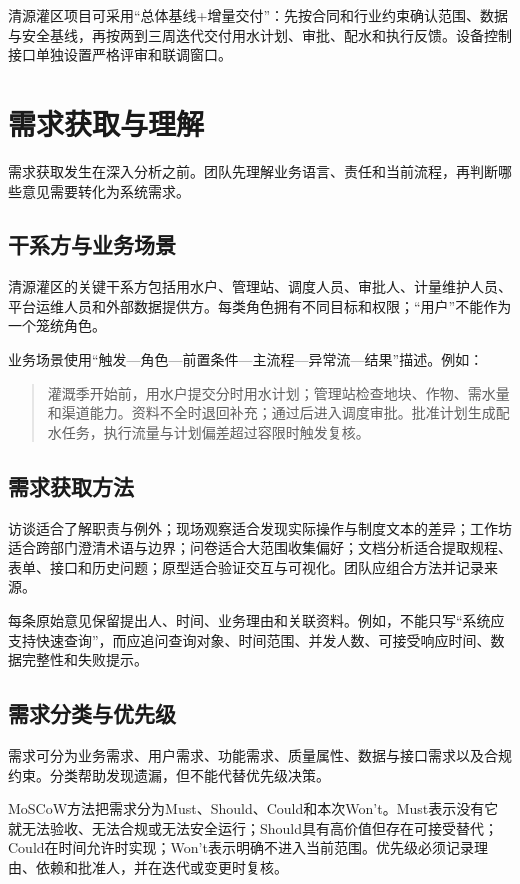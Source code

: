 清源灌区项目可采用“总体基线+增量交付”：先按合同和行业约束确认范围、数据与安全基线，再按两到三周迭代交付用水计划、审批、配水和执行反馈。设备控制接口单独设置严格评审和联调窗口。

\section{需求获取与理解}

需求获取发生在深入分析之前。团队先理解业务语言、责任和当前流程，再判断哪些意见需要转化为系统需求。

\subsection{干系方与业务场景}

清源灌区的关键干系方包括用水户、管理站、调度人员、审批人、计量维护人员、平台运维人员和外部数据提供方。每类角色拥有不同目标和权限；“用户”不能作为一个笼统角色。

业务场景使用“触发—角色—前置条件—主流程—异常流—结果”描述。例如：

\begin{quote}
灌溉季开始前，用水户提交分时用水计划；管理站检查地块、作物、需水量和渠道能力。资料不全时退回补充；通过后进入调度审批。批准计划生成配水任务，执行流量与计划偏差超过容限时触发复核。
\end{quote}

\subsection{需求获取方法}

访谈适合了解职责与例外；现场观察适合发现实际操作与制度文本的差异；工作坊适合跨部门澄清术语与边界；问卷适合大范围收集偏好；文档分析适合提取规程、表单、接口和历史问题；原型适合验证交互与可视化。团队应组合方法并记录来源。

每条原始意见保留提出人、时间、业务理由和关联资料。例如，不能只写“系统应支持快速查询”，而应追问查询对象、时间范围、并发人数、可接受响应时间、数据完整性和失败提示。

\subsection{需求分类与优先级}

需求可分为业务需求、用户需求、功能需求、质量属性、数据与接口需求以及合规约束。分类帮助发现遗漏，但不能代替优先级决策。

MoSCoW方法把需求分为Must、Should、Could和本次Won't。Must表示没有它就无法验收、无法合规或无法安全运行；Should具有高价值但存在可接受替代；Could在时间允许时实现；Won't表示明确不进入当前范围。优先级必须记录理由、依赖和批准人，并在迭代或变更时复核。

